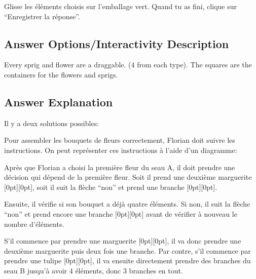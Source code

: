 \documentclass[a4paper,11pt]{report}
\newcommand{\taskGraphicsFolder}{..}
\begin{document}
Glisse les éléments choisis sur l’emballage vert. Quand tu as fini, clique sur “Enregistrer la réponse”.

\begingroup
\renewcommand{\arraystretch}{1.5}
\subsection*{Answer Options/Interactivity Description}

Every sprig and flower are a draggable. ($4$ from each type). The squares are the containers for the flowers and sprigs.

\endgroup

\subsection*{Answer Explanation}

Il y a deux solutions possibles:

{\centering%
\raisebox{-0.5ex}{}
\raisebox{-0.5ex}{}\par}

Pour assembler les bouquets de fleurs correctement, Florian doit suivre les instructions. On peut représenter ces instructions à l’aide d’un diagramme:

{\centering%
\par}

Après que Florian a choisi la première fleur du seau A, il doit prendre une décision qui dépend de la première fleur. Soit il prend une deuxième marguerite \raisebox{\dimexpr -0.5ex -1.0ex \relax}[0pt][0pt]{}, soit il suit la flèche “non” et prend une branche \raisebox{\dimexpr -0.5ex -0.5ex \relax}[0pt][0pt]{}.

Ensuite, il vérifie si son bouquet a déjà quatre éléments. Si non, il suit la flèche “non” et prend encore une branche \raisebox{\dimexpr -0.5ex -0.5ex \relax}[0pt][0pt]{} avant de vérifier à nouveau le nombre d’éléments.

S’il commence par prendre une marguerite \raisebox{\dimexpr -0.5ex -1.0ex \relax}[0pt][0pt]{}, il va donc prendre une deuxième marguerite puis deux fois une branche. Par contre, s’il commence par prendre une tulipe \raisebox{-0.5ex}[0pt][0pt]{}, il va ensuite directement prendre des branches du seau B jusqu’à avoir $4$ éléments, donc $3$ branches en tout.
\end{document}

